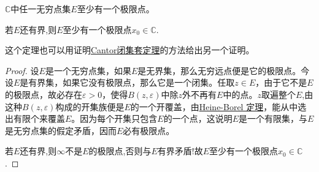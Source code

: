 \documentclass[../../main.tex]{subfiles}%
\begin{document}
\begin{theorem}\label{theorem:Bolzano-Weierstrass定理}
$\mathbb{C}$中任一无穷点集$E$至少有一个极限点。

若$E$还有界,则$E$至少有一个极限点$x_0\in \mathbb{C}$.
\end{theorem}
\begin{remark}
这个定理也可以用证明\hyperref[theorem:复变函数--Cantor闭集套定理]{Cantor闭集套定理}的方法给出另一个证明。
\end{remark}
\begin{proof}

设\(E\)是一个无穷点集，如果\(E\)是无界集，那么无穷远点便是它的极限点。今设\(E\)是有界集，如果它没有极限点，那么它是一个闭集。任取\(z \in E\)，由于它不是\(E\)的极限点，故必存在\(\varepsilon > 0\)，使得\(B(z, \varepsilon)\)中除\(z\)外不再有\(E\)中的点。$z$取遍整个$E$,由这种\(B(z, \varepsilon)\)构成的开集族便是\(E\)的一个开覆盖，由\hyperref[theorem:Heine-Borel定理]{Heine-Borel 定理}，能从中选出有限个来覆盖\(E\)。因为每个开集只包含\(E\)的一个点，这说明\(E\)是一个有限集，与\(E\)是无穷点集的假定矛盾，因而\(E\)必有极限点。

若$E$还有界,则$\infty$不是$E$的极限点,否则与$E$有界矛盾!故$E$至少有一个极限点$x_0\in \mathbb{C}$.

\end{proof}
\end{document}
